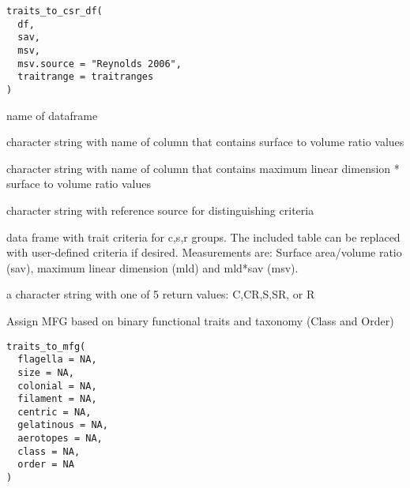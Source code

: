 \documentclass[a4paper]{book}
\begin{document}
%
\begin{Usage}
\begin{verbatim}
traits_to_csr_df(
  df,
  sav,
  msv,
  msv.source = "Reynolds 2006",
  traitrange = traitranges
)
\end{verbatim}
\end{Usage}
%
\begin{Arguments}
\begin{ldescription}
\item[\code{df}] name of dataframe

\item[\code{sav}] character string with name of column that contains surface to volume ratio values

\item[\code{msv}] character string with name of column that contains maximum linear dimension * surface to volume ratio values

\item[\code{msv.source}] character string with reference source for distinguishing criteria

\item[\code{traitrange}] data frame with trait criteria for c,s,r groups. The included table
can be replaced with user-defined criteria if desired. Measurements are:
Surface area/volume ratio (sav), maximum linear dimension (mld) and mld*sav (msv).
\end{ldescription}
\end{Arguments}
%
\begin{Value}
a character string with one of 5 return values: C,CR,S,SR, or R
\end{Value}
%
\begin{Examples}
\end{Examples}
%
\begin{Description}\relax
Assign MFG based on binary functional traits and taxonomy (Class and Order)
\end{Description}
%
\begin{Usage}
\begin{verbatim}
traits_to_mfg(
  flagella = NA,
  size = NA,
  colonial = NA,
  filament = NA,
  centric = NA,
  gelatinous = NA,
  aerotopes = NA,
  class = NA,
  order = NA
)
\end{verbatim}
\end{Usage}
\end{document}

